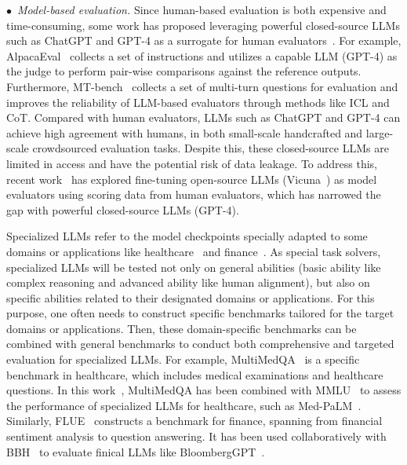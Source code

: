 $\bullet$~\emph{Model-based evaluation.}
Since human-based evaluation is both expensive and time-consuming, some work has proposed leveraging powerful closed-source LLMs such as ChatGPT and GPT-4 as a surrogate for human evaluators~\cite{Zheng-2023-arxiv-Judging, Li-2023-github-alpaca_eval}.
For example, AlpacaEval~\cite{Li-2023-github-alpaca_eval} collects a set of instructions and utilizes a capable LLM (\eg GPT-4) as the judge to perform pair-wise comparisons against the reference outputs.
Furthermore, MT-bench~\cite{Zheng-2023-arxiv-Judging} collects a set of multi-turn questions for evaluation and improves the reliability of LLM-based evaluators through methods like ICL and CoT.
Compared with human evaluators, LLMs such as ChatGPT and GPT-4 can achieve high agreement with humans, in both small-scale handcrafted and large-scale crowdsourced evaluation tasks.
Despite this, these closed-source LLMs are limited in access and have the potential risk of data leakage.
To address this, recent work~\cite{Zheng-2023-arxiv-Judging} has explored fine-tuning open-source LLMs (\eg Vicuna~\cite{vicuna2023}) as model evaluators using scoring data from human evaluators, which has  narrowed the gap with powerful closed-source LLMs (\eg GPT-4).

%

Specialized LLMs refer to the model checkpoints specially adapted to some domains or applications like healthcare~\cite{singhal-arxiv-2022-large} and finance~\cite{Shah-2022-EMNLP-When}.
As special task solvers, specialized LLMs will be tested not only on general abilities (\eg basic ability like complex reasoning and advanced ability like human alignment), but also on specific abilities related to their designated domains or applications.
For this purpose, one often needs to construct specific benchmarks tailored for the target domains or applications. 
Then, these domain-specific benchmarks can be combined with general benchmarks to conduct both comprehensive and targeted evaluation for specialized LLMs.
For example, MultiMedQA~\cite{singhal-arxiv-2022-large} is a specific benchmark in healthcare, which includes medical examinations and healthcare questions.
In this work~\cite{singhal-arxiv-2022-large}, MultiMedQA has been combined  with MMLU~\cite{Hendrycks-ICLR-2021-Measuring} to assess the performance of specialized LLMs for healthcare, such as Med-PaLM~\cite{singhal-arxiv-2022-large}.
Similarly, FLUE~\cite{Shah-2022-EMNLP-When} constructs a benchmark for finance, spanning from financial sentiment analysis to question answering.
It has been used collaboratively with BBH~\cite{Suzgun-arxiv-2022-Challenging} to evaluate finical LLMs like BloombergGPT~\cite{wu-arxiv-2023-bloomberggpt}.


